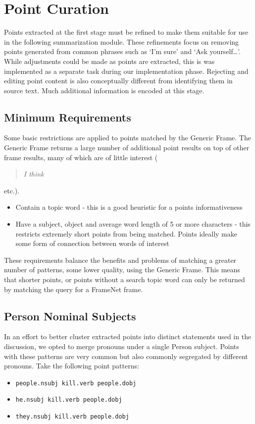 \chapter{Point Curation\label{chap:point-curation}}
  Points extracted at the first stage must be refined to make them suitable for use in the following summarization module. These refinements focus on removing points generated from common phrases such as `I'm sure' and `Ask yourself\dots'. While adjustments could be made as points are extracted, this is was implemented as a separate task during our implementation phase. Rejecting and editing point content is also conceptually different from identifying them in source text. Much additional information is encoded at this stage.

  \section{Minimum Requirements}
  Some basic restrictions are applied to points matched by the Generic Frame. The Generic Frame returns a large number of additional point results on top of other frame results, many of which are of little interest (\blockquote{\textit{I think}} etc.).

    \begin{itemize}
      \item{Contain a topic word - this is a good heuristic for a points informativeness}
      \item{Have a subject, object and average word length of 5 or more characters - this restricts extremely short points from being matched. Points ideally make some form of connection between words of interest}
    \end{itemize}

    These requirements balance the benefits and problems of matching a greater number of patterns, some lower quality, using the Generic Frame. This means that shorter points, or points without a search topic word can only be returned by matching the query for a FrameNet frame.

  \section{Person Nominal Subjects}
    In an effort to better cluster extracted points into distinct statements used in the discussion, we opted to merge pronouns under a single Person subject. Points with these patterns are very common but also commonly segregated by different pronouns. Take the following point patterns:
    \begin{itemize}
      \item{\texttt{people.nsubj kill.verb people.dobj}}
      \item{\texttt{he.nsubj kill.verb people.dobj}}
      \item{\texttt{they.nsubj kill.verb people.dobj}}
    \end{itemize}

